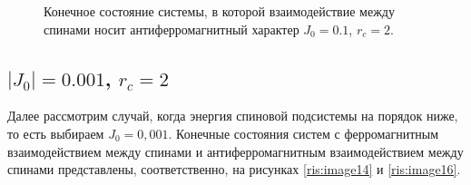 \documentclass[14pt,a4paper,report]{ncc}
\begin{document}
\begin{figure}[h]
\begin{minipage}[h]{0.49\linewidth}
\end{minipage}
\hfill
\begin{minipage}[h]{0.49\linewidth}
\end{minipage}
\caption{Конечное состояние системы, в которой взаимодействие между спинами носит антиферромагнитный характер $J_0=0.1$, $r_c=2$.}
\label{ris:image9}
\end{figure}


\newpage
\subsection{$|J_0|=0.001$, $r_c=2$}
Далее рассмотрим случай, когда энергия спиновой подсистемы на порядок ниже, то есть выбираем $J_0=0,001$. Конечные состояния систем с ферромагнитным взаимодействием между спинами и антиферромагнитным взаимодействием между спинами представлены, соответственно, на рисунках \ref{ris:image14} и \ref{ris:image16}.
\ 
\end{document}
